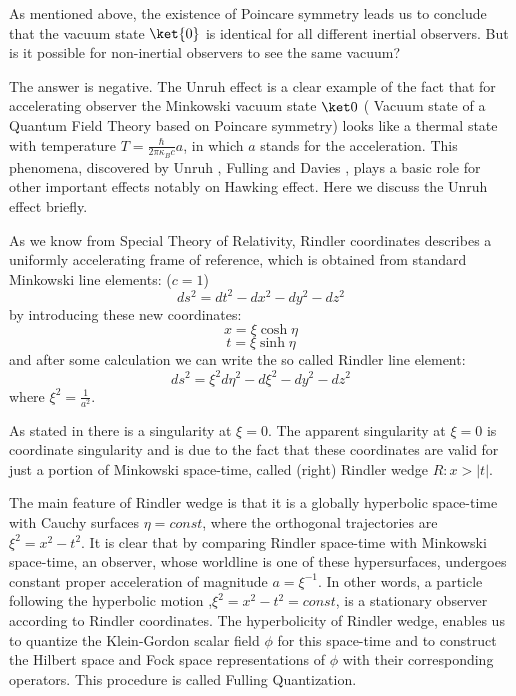 \documentclass[12pt,a4paper]{article}
\begin{document}
As mentioned above, the existence of Poincare symmetry leads us to conclude that the vacuum state $\ket{0}$ is identical for all different inertial observers.
But is it possible for non-inertial observers to see the same vacuum? 

The answer is negative. The Unruh effect is a clear example of the fact that for accelerating observer the Minkowski vacuum state $\ket0$ ( Vacuum state of a Quantum Field Theory based on Poincare symmetry) looks like a thermal state with temperature $ T= \frac{\hbar}{2\pi\kappa_B c} a$, in which $a$ stands for the acceleration. This phenomena, discovered by Unruh\cite{Unruh} , Fulling\cite{Fulling}  and Davies \cite{Davies} , plays a basic role for other important effects notably on Hawking effect. Here we discuss the Unruh effect briefly.

 As we know from Special Theory of Relativity, Rindler coordinates describes a uniformly accelerating frame of reference, which is obtained from standard Minkowski line elements: ($c=1$)
\begin{equation}
ds^2=dt^2-dx^2-dy^2-dz^2
\end{equation}
 by introducing these new coordinates:
\begin{equation}\label{transformation}
x=\xi \cosh{\eta}  
\end{equation}
$$ t=\xi \sinh{\eta}$$ 
and after some calculation we can write the so called Rindler line element: 
\begin{equation}
ds^2=\xi^2 d\eta^2-d\xi^2-dy^2-dz^2
\end{equation} where $\xi^2=\frac{1}{a^2}$. 

As stated in \cite{Arageorgis} there is a singularity at $\xi=0$. The apparent singularity at $\xi=0$ is coordinate singularity and is due to the fact that these coordinates are valid for just a portion of Minkowski space-time, called (right) Rindler wedge $R: x> |t|$.

The main feature of Rindler wedge is that it is a globally hyperbolic space-time with Cauchy surfaces $\eta=const$, where the orthogonal trajectories are $\xi^2=x^2 - t^2$. It is clear that by comparing Rindler space-time with Minkowski space-time, an observer, whose worldline is one of these hypersurfaces, undergoes constant proper acceleration of magnitude $a=\xi^{-1}$. In other words, a particle following the hyperbolic motion ,$\xi^2=x^2-t^2=const$, is a stationary observer according to Rindler coordinates.
The hyperbolicity of Rindler wedge, enables us to quantize the Klein-Gordon scalar field  $\phi$ for this space-time and to construct the Hilbert space and Fock space representations of $\phi$ with their corresponding operators. This procedure is called Fulling Quantization.
\end{document}
